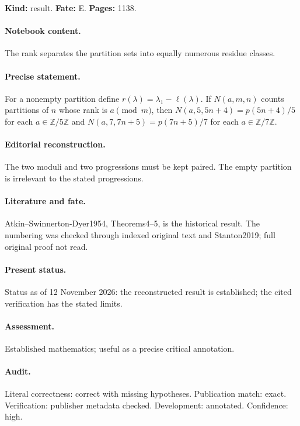 \label{item:1983-611.3}

\noindent\textbf{Kind:} result. \textbf{Fate:} E. \textbf{Pages:} 1138.\par

\paragraph{Notebook content.} The rank separates the partition sets into equally numerous residue classes.

\paragraph{Precise statement.} For a nonempty partition define $r(\lambda)=\lambda_1-\ell(\lambda)$. If $N(a,m,n)$ counts partitions of $n$ whose rank is $a\pmod m$, then $N(a,5,5n+4)=p(5n+4)/5$ for each $a\in\mathbb Z/5\mathbb Z$ and $N(a,7,7n+5)=p(7n+5)/7$ for each $a\in\mathbb Z/7\mathbb Z$.

\paragraph{Editorial reconstruction.} The two moduli and two progressions must be kept paired. The empty partition is irrelevant to the stated progressions.

\paragraph{Literature and fate.} Atkin--Swinnerton-Dyer1954, Theorems4--5, is the historical result. The numbering was checked through indexed original text and Stanton2019; full original proof not read.

\paragraph{Present status.} Status as of 12 November 2026: the reconstructed result is established; the cited verification has the stated limits.

\paragraph{Assessment.} Established mathematics; useful as a precise critical annotation.

\paragraph{Audit.} Literal correctness: correct with missing hypotheses. Publication match: exact. Verification: publisher metadata checked. Development: annotated. Confidence: high.

